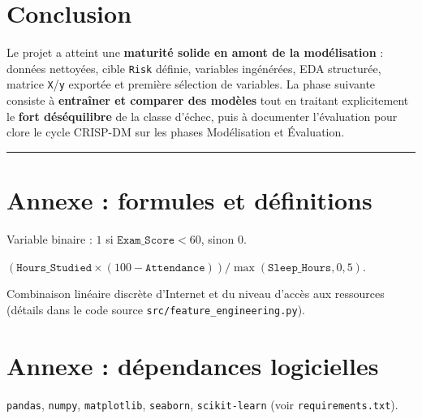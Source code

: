 \documentclass[a4paper,11pt]{article}
\begin{document}
\section{Conclusion}

Le projet a atteint une \textbf{maturité solide en amont de la modélisation} : données nettoyées, cible \texttt{Risk} définie, variables ingénérées, EDA structurée, matrice \texttt{X}/\texttt{y} exportée et première sélection de variables. La phase suivante consiste à \textbf{entraîner et comparer des modèles} tout en traitant explicitement le \textbf{fort déséquilibre} de la classe d'échec, puis à documenter l'évaluation pour clore le cycle CRISP-DM sur les phases Modélisation et Évaluation.

\vspace{1em}
\noindent\rule{\textwidth}{0.4pt}

\appendix
\section{Annexe : formules et définitions}

\begin{description}[style=nextline]
  \item[Risk] Variable binaire : $1$ si $\texttt{Exam\_Score} < 60$, sinon $0$.
  \item[Indice de stress académique] $(\texttt{Hours\_Studied} \times (100-\texttt{Attendance}))/\max(\texttt{Sleep\_Hours},0{,}5)$.
  \item[Score d'accès numérique] Combinaison linéaire discrète d'Internet et du niveau d'accès aux ressources (détails dans le code source \texttt{src/feature\_engineering.py}).
\end{description}

\section{Annexe : dépendances logicielles}

\texttt{pandas}, \texttt{numpy}, \texttt{matplotlib}, \texttt{seaborn}, \texttt{scikit-learn} (voir \texttt{requirements.txt}).
\end{document}
